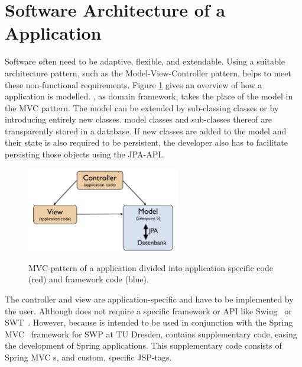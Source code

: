 \section{Software Architecture of a \salespoint{} Application}
Software often need to be adaptive, flexible, and extendable.
Using a suitable architecture pattern, such as the Model-View-Controller pattern, helps to meet these non-functional requirements.
Figure \ref{sp5-arch} gives an overview of how a \salespoint{} application is modelled.
\salespoint{}, as domain framework, takes the place of the model in the MVC pattern.
The model can be extended by sub-classing \salespoint{} classes or by introducing entirely new classes.
\salespoint{} model classes and sub-classes thereof are transparently stored in a database.
If new classes are added to the model and their state is also required to be persistent, the developer also has to facilitate persisting those objects using the JPA-API.

\begin{figure}[ht]
	\centering
  \includegraphics[width=0.6\textwidth]{images/sp5-arch.pdf}
	\label{sp5-arch}
	\caption[Overview of a \salespoint{} application.]{MVC-pattern of a \salespoint{} application divided into application specific code (red) and framework code (blue).}
\end{figure}

The controller and view are application-specific and have to be implemented by the user.
Although \salespoint{} does not require a specific framework or API like Swing~\cite{swing} or SWT~\cite{swt}.
However, because \salespoint{} is intended to be used in conjunction with the Spring MVC~\cite{spring} framework for SWP at TU Dresden, \salespoint{} contains supplementary code, easing the development of Spring applications.
This supplementary code consists of Spring MVC s, and custom, \salespoint{} specific JSP-tags.
\\

